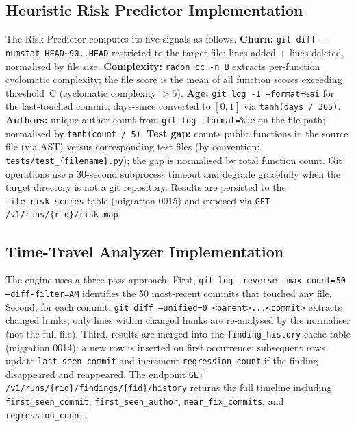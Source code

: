 \subsection{Heuristic Risk Predictor Implementation}

\begin{sloppypar}
The Risk Predictor computes its five signals as follows. \textbf{Churn:} \texttt{git diff --numstat HEAD\textasciitilde{}90..HEAD} restricted to the target file; lines-added + lines-deleted, normalised by file size. \textbf{Complexity:} \texttt{radon cc -n B} extracts per-function cyclomatic complexity; the file score is the mean of all function scores exceeding threshold~C (cyclomatic complexity $> 5$). \textbf{Age:} \texttt{git log -1 --format=\%ai} for the last-touched commit; days-since converted to $[0,1]$ via \texttt{tanh(days / 365)}. \textbf{Authors:} unique author count from \texttt{git log --format=\%ae} on the file path; normalised by \texttt{tanh(count / 5)}. \textbf{Test gap:} counts public functions in the source file (via AST) versus corresponding test files (by convention: \texttt{tests/test\_\{filename\}.py}); the gap is normalised by total function count. Git operations use a 30-second subprocess timeout and degrade gracefully when the target directory is not a git repository. Results are persisted to the \texttt{file\_risk\_scores} table (migration 0015) and exposed via \texttt{GET /v1/runs/\{rid\}/risk-map}.
\end{sloppypar}

\subsection{Time-Travel Analyzer Implementation}

\begin{sloppypar}
The engine uses a three-pass approach. First, \texttt{git log --reverse --max-count=50 --diff-filter=AM} identifies the 50 most-recent commits that touched any file. Second, for each commit, \texttt{git diff --unified=0 <parent>...<commit>} extracts changed hunks; only lines within changed hunks are re-analysed by the normaliser (not the full file). Third, results are merged into the \texttt{finding\_history} cache table (migration 0014): a new row is inserted on first occurrence; subsequent rows update \texttt{last\_seen\_commit} and increment \texttt{regression\_count} if the finding disappeared and reappeared. The endpoint \texttt{GET /v1/runs/\{rid\}/findings/\{fid\}/history} returns the full timeline including \texttt{first\_seen\_commit}, \texttt{first\_seen\_author}, \texttt{near\_fix\_commits}, and \texttt{regression\_count}.
\end{sloppypar}

